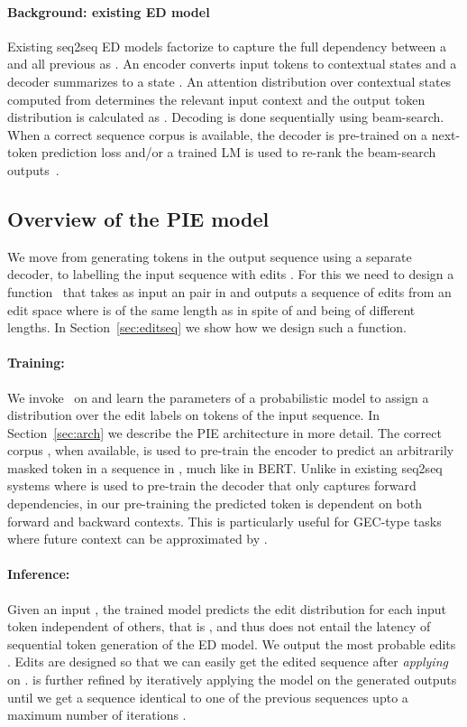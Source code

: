 \documentclass[11pt,a4paper]{article}
\newcommand{\editF}{{\text{Seq2Edits}}}
\begin{document}
\paragraph{Background: existing ED model} Existing seq2seq ED models factorize  to capture the full dependency between a  and all previous  as .  An encoder converts input tokens  to contextual states  and a decoder summarizes  to a state . An attention distribution over contextual states computed from  determines the relevant input context  and the output token distribution is calculated as . Decoding is done sequentially using beam-search. When a correct sequence corpus  is available, the decoder is pre-trained  on a next-token prediction loss and/or a trained LM is used to re-rank the beam-search outputs~\cite{zhao2019improving, chollampatt2018mlconv, junczys2018approaching}.


\subsection{Overview of the PIE model}
We move from generating tokens in the output sequence  using a separate decoder, to labelling the input sequence  with edits .
For this we need to design a function \editF\ that takes as input an 
pair in  and outputs a sequence  of edits from an edit space
 where  is of the same length as  in spite of 
and  being of different lengths.  In Section~\ref{sec:editseq}
we show how we design such a function.

\paragraph{Training:}
We invoke \editF\ on  and learn the parameters of a probabilistic model  to assign a distribution over the edit labels on tokens of the input sequence. In Section~\ref{sec:arch} we describe the PIE architecture in more detail.
The correct corpus  , when available, is used to pre-train the encoder to predict an arbitrarily masked token  in a sequence  in , much like in BERT.  Unlike in existing seq2seq systems where  is used to pre-train the decoder that only captures forward dependencies, in our pre-training the predicted token  is dependent on both forward and backward contexts. This is particularly useful for GEC-type tasks where future context  can be approximated by . 

\paragraph{Inference: } Given an input , the trained model predicts the edit distribution for each input token independent of others, that is ,  and thus does not entail the latency of sequential token generation of the ED model. We output the most probable edits .
Edits are designed so that we can easily get the edited sequence  after {\em applying}  on .  is further refined by iteratively applying the model on the generated outputs  until we get a sequence identical to one of the previous sequences upto a maximum number of iterations .
\end{document}

